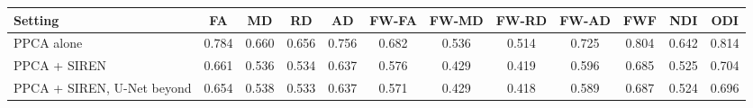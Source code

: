 \begin{tabular}{lccccccccccc}
\toprule
Setting & FA & MD & RD & AD & FW-FA & FW-MD & FW-RD & FW-AD & FWF & NDI & ODI \\
\midrule
PPCA alone & 0.784 & 0.660 & 0.656 & 0.756 & 0.682 & 0.536 & 0.514 & 0.725 & 0.804 & 0.642 & 0.814 \\
PPCA + SIREN & 0.661 & 0.536 & 0.534 & 0.637 & 0.576 & 0.429 & 0.419 & 0.596 & 0.685 & 0.525 & 0.704 \\
PPCA + SIREN, U-Net beyond & 0.654 & 0.538 & 0.533 & 0.637 & 0.571 & 0.429 & 0.418 & 0.589 & 0.687 & 0.524 & 0.696 \\
\bottomrule
\end{tabular}
